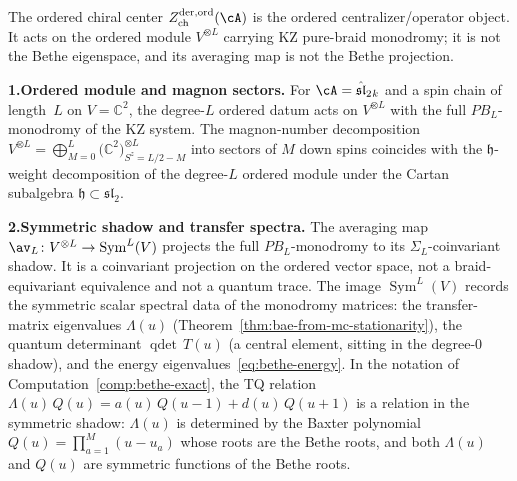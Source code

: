 \begin{remark}
\label{rem:ordered-center-bethe}
The ordered chiral center
$Z_{\mathrm{ch}}^{\mathrm{der,ord}}(\cA)$ is the ordered
centralizer/operator object. It acts on the ordered module
$V^{\otimes L}$ carrying KZ pure-braid monodromy; it is not the Bethe
eigenspace, and its averaging map is not the Bethe projection.

\textbf{1.\@ Ordered module and magnon sectors.}
For $\cA = \hat{\mathfrak{sl}}_2{}_k$ and a spin chain of
length~$L$ on $V = \mathbb{C}^2$, the degree-$L$ ordered datum acts on
$V^{\otimes L}$ with the full $PB_L$-monodromy of the KZ system. The
magnon-number decomposition
$V^{\otimes L}
= \bigoplus_{M=0}^{L}
\bigl(\mathbb{C}^2\bigr)^{\otimes L}_{S^z = L/2 - M}$
into sectors of $M$ down spins coincides with the
$\mathfrak{h}$-weight decomposition of the degree-$L$
ordered module under the Cartan subalgebra $\mathfrak{h}
\subset \mathfrak{sl}_2$.

\textbf{2.\@ Symmetric shadow and transfer spectra.}
The averaging map $\av_L \colon V^{\otimes L}
\to \operatorname{Sym}^L(V)$ projects the full
$PB_L$-monodromy to its $\Sigma_L$-coinvariant shadow.
It is a coinvariant projection on the ordered vector space, not a
braid-equivariant equivalence and not a quantum trace.
The image $\operatorname{Sym}^L(V)$ records the symmetric scalar
spectral data of the monodromy matrices: the transfer-matrix
eigenvalues $\Lambda(u)$
(Theorem~\ref{thm:bae-from-mc-stationarity}),
the quantum determinant $\operatorname{qdet}\,T(u)$
(a central element, sitting in the degree-$0$ shadow), and the
energy eigenvalues~\eqref{eq:bethe-energy}.
In the notation of Computation~\ref{comp:bethe-exact},
the TQ relation
$\Lambda(u)\,Q(u) = a(u)\,Q(u-1) + d(u)\,Q(u+1)$
is a relation in the symmetric shadow:
$\Lambda(u)$ is determined by the Baxter polynomial
$Q(u) = \prod_{a=1}^{M}(u - u_a)$ whose roots are the Bethe
roots, and both $\Lambda(u)$ and $Q(u)$ are symmetric functions
of the Bethe roots.


\end{remark}
